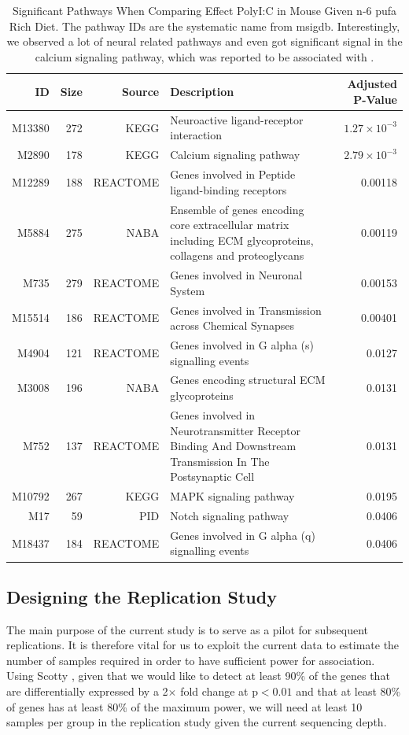 \begin{landscape}
	\begin{table}
		\begin{tabular}{rrrp{10cm}r}
			\toprule
			ID&	Size&	Source&	Description&	Adjusted P-Value\\
			\midrule
			M13380&	272&	KEGG&	Neuroactive ligand-receptor interaction&	$1.27\times10^{-3}$\\
			M2890&	178&	KEGG&	Calcium signaling pathway&	$2.79\times10^{-3}$\\
			M12289&	188&	REACTOME&	Genes involved in Peptide ligand-binding receptors&	0.00118\\
			M5884&	275&	NABA&	Ensemble of genes encoding core extracellular matrix including ECM glycoproteins, collagens and proteoglycans&	0.00119\\
			M735&	279&	REACTOME&	Genes involved in Neuronal System&	0.00153\\
			M15514&	186&	REACTOME&	Genes involved in Transmission across Chemical Synapses&	0.00401\\
			M4904&	121&	REACTOME&	Genes involved in G alpha (s) signalling events&	0.0127\\
			M3008&	196&	NABA&	Genes encoding structural ECM glycoproteins&	0.0131\\
			M752&	137&	REACTOME&	Genes involved in Neurotransmitter Receptor Binding And Downstream Transmission In The Postsynaptic Cell&	0.0131\\
			M10792&	267&	KEGG&	MAPK signaling pathway&	0.0195\\
			M17&	59&	PID&	Notch signaling pathway&	0.0406\\
			M18437&	184&	REACTOME&	Genes involved in G alpha (q) signalling events&	0.0406\\
			\bottomrule
		\end{tabular}
		\caption[Significant Pathways When Comparing Effect PolyI:C in Mouse Given n-6 \gls{pufa} Rich Diet]{Significant Pathways When Comparing Effect PolyI:C in Mouse Given n-6 \gls{pufa} Rich Diet.
			The pathway IDs are the systematic name from \gls{msigdb}.
			Interestingly, we observed a lot of neural related pathways and even got significant signal in the calcium signaling pathway, which was reported to be associated with  \citep{Purcell2014}. 
		}
		\label{tab:miaPath}
	\end{table}
\end{landscape}
\subsection{Designing the Replication Study}
The main purpose of the current study is to serve as a pilot for subsequent replications.
It is therefore vital for us to exploit the current data to estimate the number of samples required in order to have sufficient power for association.
Using Scotty \citep{Busby2013}, given that we would like to detect at least 90\% of the genes that are differentially expressed by a 2$\times$ fold change at p$<0.01$ and that at least 80\% of genes has at least 80\% of the maximum power, we will need at least 10 samples per group in the replication study given the current sequencing depth.


